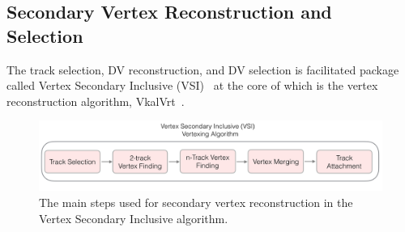 \subsection{Secondary Vertex Reconstruction and Selection}
The track selection, DV reconstruction, and DV selection is facilitated package called Vertex Secondary Inclusive (VSI)~\cite{ATL-PHYS-PUB-2019-013} at the core of which is the vertex reconstruction algorithm, VkalVrt~\cite{Kostyukhin:685551}.

\begin{figure}[!ht]
    \centering
    \includegraphics[width=0.8\linewidth]{figures//analysis_overview/vertexing/VSIalg.png}
    \caption{The main steps used for secondary vertex reconstruction in the Vertex Secondary Inclusive algorithm.~\cite{ATL-PHYS-PUB-2019-013}}
    \label{fig:vsi-steps}
\end{figure}


